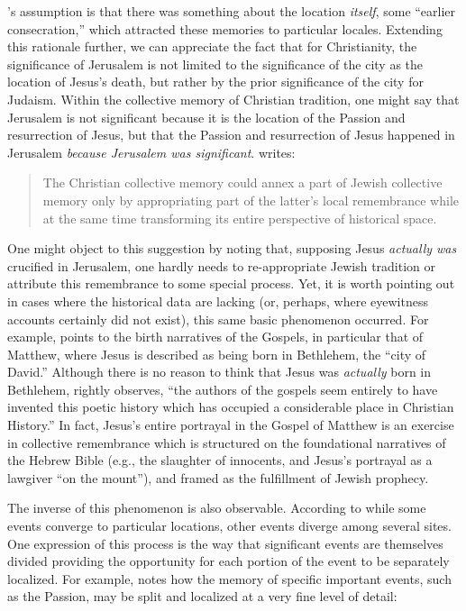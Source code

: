 \halbwachs's assumption is that there was something
about the location \emph{itself}, some ``earlier
consecration,''\autocite[220]{halbwachs1992} which attracted these
memories to particular locales. Extending this rationale further, we can
appreciate the fact that for Christianity, the significance of Jerusalem
is not limited to the significance of the city as the location of
Jesus's death, but rather by the prior significance of the city for
Judaism. Within the collective memory of Christian tradition, one might
say that Jerusalem is not significant because it is the location of the
Passion and resurrection of Jesus, but that the Passion and resurrection
of Jesus happened in Jerusalem \emph{because Jerusalem was significant}.
\halbwachs writes:

\begin{quote}
The Christian collective memory could annex a part of Jewish collective
memory only by appropriating part of the latter's local remembrance
while at the same time transforming its entire perspective of historical
space.\autocite[215]{halbwachs1992}
\end{quote}

One might object to this suggestion by noting that, supposing Jesus
\emph{actually was} crucified in Jerusalem, one hardly needs to
re-appropriate Jewish tradition or attribute this remembrance to some
special process. Yet, it is worth pointing out in cases where the
historical data are lacking (or, perhaps, where eyewitness accounts
certainly did not exist), this same basic phenomenon occurred. For
example, \halbwachs points to the birth narratives of
the Gospels, in particular that of Matthew, where Jesus is described as
being born in Bethlehem, the ``city of David.'' Although there is no
reason to think that Jesus was \emph{actually} born in Bethlehem,
\halbwachs rightly observes, ``the authors of the
gospels seem entirely to have invented this poetic history which has
occupied a considerable place in Christian
History.''\autocite[214]{halbwachs1992} In fact, Jesus's entire
portrayal in the Gospel of Matthew is an exercise in collective
remembrance which is structured on the foundational narratives of the
Hebrew Bible (e.g., the slaughter of innocents, and Jesus's portrayal as
a lawgiver ``on the mount''), and framed as the fulfillment of Jewish
prophecy.

The inverse of this phenomenon is also observable. According to
\halbwachs while some events converge to particular
locations, other events diverge among several sites. One expression of
this process is the way that significant events are themselves divided
providing the opportunity for each portion of the event to be separately
localized. For example, \halbwachs notes how the memory
of specific important events, such as the Passion, may be split and
localized at a very fine level of detail:

